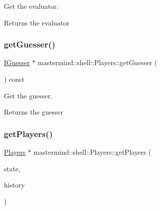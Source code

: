 Get the evaluator. 

\begin{DoxyReturn}{Returns}
the evaluator 
\end{DoxyReturn}
\hypertarget{classmastermind_1_1shell_1_1_players_a6835bb0025cb106959de2fe9db15c646}{}\label{classmastermind_1_1shell_1_1_players_a6835bb0025cb106959de2fe9db15c646} 
\subsubsection{\texorpdfstring{get\+Guesser()}{getGuesser()}}
{\footnotesize\ttfamily \hyperlink{classmastermind_1_1logic_1_1_i_guesser}{I\+Guesser} $\ast$ mastermind\+::shell\+::\+Players\+::get\+Guesser (\begin{DoxyParamCaption}{ }\end{DoxyParamCaption}) const}



Get the guesser. 

\begin{DoxyReturn}{Returns}
the guesser 
\end{DoxyReturn}
\hypertarget{classmastermind_1_1shell_1_1_players_a5e8a48c86167f6bb947408bd7614c047}{}\label{classmastermind_1_1shell_1_1_players_a5e8a48c86167f6bb947408bd7614c047} 
\subsubsection{\texorpdfstring{get\+Players()}{getPlayers()}}
{\footnotesize\ttfamily \hyperlink{classmastermind_1_1shell_1_1_players}{Players} $\ast$ mastermind\+::shell\+::\+Players\+::get\+Players (\begin{DoxyParamCaption}\item[{\hyperlink{classmastermind_1_1shell_1_1_state}{State}}]{state,  }\item[{\hyperlink{classmastermind_1_1logic_1_1_game_history}{Game\+History} $\ast$}]{history }\end{DoxyParamCaption})\hspace{0.3cm}{\ttfamily [static]}}



